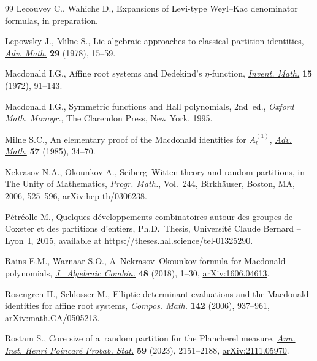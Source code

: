 \documentclass[pdftex]{sigma}
\numberwithin{equation}{section}
\begin{document}
\begin{thebibliography}{99}
Lecouvey C., Wahiche D., Expansions of {L}evi-type {W}eyl--{K}ac denominator
 formulas, {i}n preparation.

Lepowsky J., Milne S., Lie algebraic approaches to classical partition
 identities, \href{https://doi.org/10.1016/0001-8708(78)90004-X}{\textit{Adv. Math.}} \textbf{29} (1978), 15--59.

Macdonald I.G., Affine root systems and {D}edekind's {$\eta $}-function,
 \href{https://doi.org/10.1007/BF01418931}{\textit{Invent. Math.}} \textbf{15} (1972), 91--143.

Macdonald I.G., Symmetric functions and {H}all polynomials, 2nd~ed., \textit{Oxford
 Math. Monogr.}, The Clarendon Press, New York, 1995.

Milne S.C., An elementary proof of the {M}acdonald identities for
 {$A^{(1)}_l$}, \href{https://doi.org/10.1016/0001-8708(85)90105-7}{\textit{Adv. Math.}} \textbf{57} (1985), 34--70.

Nekrasov N.A., Okounkov A., {S}eiberg--{W}itten theory and random partitions,
 in The Unity of Mathematics, \textit{Progr. Math.}, Vol.~244, \href{https://doi.org/10.1007/0-8176-4467-9_15}{Birkh\"auser},
 Boston, MA, 2006, 525--596, \href{https://arxiv.org/abs/hep-th/0306238}{arXiv:hep-th/0306238}.

P\'etr\'eolle M., Quelques d\'eveloppements combinatoires autour des groupes de
 Coxeter et des partitions d'entiers, Ph.D.~Thesis, {U}niversit\'e Claude
 Bernard -- Lyon~I, 2015, available at
 \url{https://theses.hal.science/tel-01325290}.

Rains E.M., Warnaar S.O., A~{N}ekrasov--{O}kounkov formula for {M}acdonald
 polynomials, \href{https://doi.org/10.1007/s10801-017-0790-2}{\textit{J.~Algebraic Combin.}} \textbf{48} (2018), 1--30,
 \href{https://arxiv.org/abs/1606.04613}{arXiv:1606.04613}.

Rosengren H., Schlosser M., Elliptic determinant evaluations and the
 {M}acdonald identities for affine root systems, \href{https://doi.org/10.1112/S0010437X0600203X}{\textit{Compos. Math.}}
 \textbf{142} (2006), 937--961, \href{https://arxiv.org/abs/math.CA/0505213}{arXiv:math.CA/0505213}.

Rostam S., Core size of a~random partition for the {P}lancherel measure,
 \href{https://doi.org/10.1214/22-aihp1310}{\textit{Ann. Inst. Henri Poincar\'e Probab. Stat.}} \textbf{59} (2023),
 2151--2188, \href{https://arxiv.org/abs/2111.05970}{arXiv:2111.05970}.


\end{thebibliography}
\end{document}
